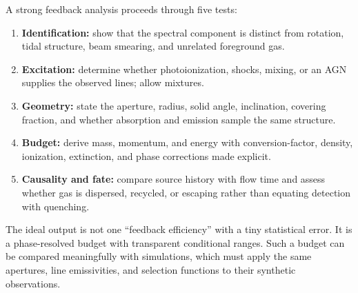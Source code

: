 A strong feedback analysis proceeds through five tests:
\begin{enumerate}
 \item \textbf{Identification:} show that the spectral component is distinct from
rotation, tidal structure, beam smearing, and unrelated foreground gas.
 \item \textbf{Excitation:} determine whether photoionization, shocks, mixing, or an
AGN supplies the observed lines; allow mixtures.
 \item \textbf{Geometry:} state the aperture, radius, solid angle, inclination,
covering fraction, and whether absorption and emission sample the same structure.
 \item \textbf{Budget:} derive mass, momentum, and energy with conversion-factor,
density, ionization, extinction, and phase corrections made explicit.
 \item \textbf{Causality and fate:} compare source history with flow time and assess
whether gas is dispersed, recycled, or escaping rather than equating detection with
quenching.
\end{enumerate}

The ideal output is not one ``feedback efficiency'' with a tiny statistical error.
It is a phase-resolved budget with transparent conditional ranges.  Such a budget can
be compared meaningfully with simulations, which must apply the same apertures, line
emissivities, and selection functions to their synthetic observations.
